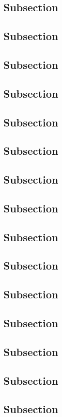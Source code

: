 {{{{\subsection{Subsection}
\subsection{Subsection}
\subsection{Subsection}
\subsection{Subsection}
\subsection{Subsection}
\subsection{Subsection}
\subsection{Subsection}
\subsection{Subsection}
\subsection{Subsection}
\subsection{Subsection}
\subsection{Subsection}
\subsection{Subsection}
\subsection{Subsection}
\subsection{Subsection}
\subsection{Subsection}
}}}}
